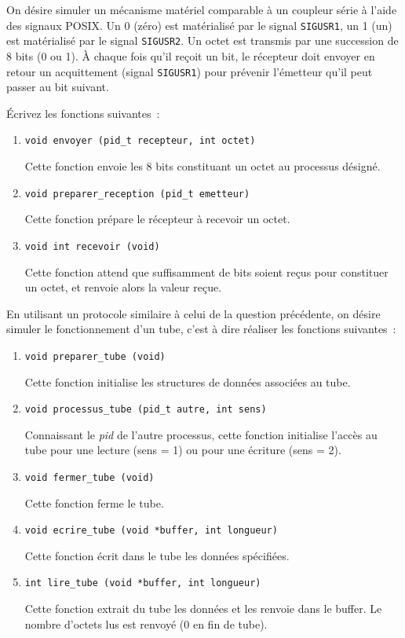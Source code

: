 \question

On désire simuler un mécanisme matériel comparable à un coupleur série
à l'aide des signaux POSIX. Un 0 (zéro) est matérialisé par le signal
{\tt SIGUSR1}, un 1 (un) est matérialisé par le signal {\tt SIGUSR2}.
Un octet est transmis par une succession de 8 bits (0 ou 1).
À chaque fois qu'il reçoit un bit, le récepteur doit envoyer en
retour un acquittement (signal {\tt SIGUSR1}) pour prévenir l'émetteur
qu'il peut passer au bit suivant.

Écrivez les fonctions suivantes~:

\begin {enumerate}
    \item \verb:void envoyer (pid_t recepteur, int octet):

	Cette fonction envoie les 8 bits constituant un octet au
	processus désigné.

    \item \verb:void preparer_reception (pid_t emetteur):

	Cette fonction prépare le récepteur à recevoir un octet.

    \item \verb:void int recevoir (void):

	Cette fonction attend que suffisamment de bits soient reçus
	pour constituer un octet,  et renvoie alors la valeur reçue.

\end {enumerate}


\question

En utilisant un protocole similaire à celui de la question précédente,
on désire simuler le fonctionnement d'un tube, c'est à dire réaliser
les fonctions suivantes~:

\begin {enumerate}
    \item \verb:void preparer_tube (void):

	Cette fonction initialise les structures de données associées
	au tube.

    \item \verb:void processus_tube (pid_t autre, int sens):

	Connaissant le \textit {pid} de l'autre processus, cette
	fonction initialise l'accès au tube pour une lecture (sens
	= 1) ou pour une écriture (sens = 2).

    \item \verb:void fermer_tube (void):

	Cette fonction ferme le tube.

    \item \verb:void ecrire_tube (void *buffer, int longueur):

	Cette fonction écrit dans le tube les données spécifiées.

    \item \verb:int lire_tube (void *buffer, int longueur):

	Cette fonction extrait du tube les données et les renvoie
	dans le buffer. Le nombre d'octets lus est renvoyé (0 en
	fin de tube).

\end {enumerate}


